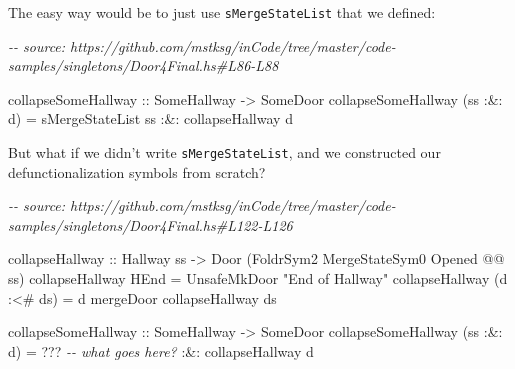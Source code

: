 \documentclass[]{article}
\newenvironment{Shaded}{}{}
\newcommand{\CommentTok}[1]{\textcolor[rgb]{0.38,0.63,0.69}{\textit{#1}}}
\newcommand{\DataTypeTok}[1]{\textcolor[rgb]{0.56,0.13,0.00}{#1}}
\newcommand{\NormalTok}[1]{#1}
\newcommand{\OperatorTok}[1]{\textcolor[rgb]{0.40,0.40,0.40}{#1}}
\newcommand{\OtherTok}[1]{\textcolor[rgb]{0.00,0.44,0.13}{#1}}
\newcommand{\StringTok}[1]{\textcolor[rgb]{0.25,0.44,0.63}{#1}}
\begin{document}
The easy way would be to just use \texttt{sMergeStateList} that we defined:

\begin{Shaded}
\begin{Highlighting}[]
\CommentTok{{-}{-} source: https://github.com/mstksg/inCode/tree/master/code{-}samples/singletons/Door4Final.hs\#L86{-}L88}

\OtherTok{collapseSomeHallway ::} \DataTypeTok{SomeHallway} \OtherTok{{-}\textgreater{}} \DataTypeTok{SomeDoor}
\NormalTok{collapseSomeHallway (ss }\OperatorTok{:\&:}\NormalTok{ d) }\OtherTok{=}\NormalTok{ sMergeStateList ss}
                             \OperatorTok{:\&:}\NormalTok{ collapseHallway d}
\end{Highlighting}
\end{Shaded}

But what if we didn't write \texttt{sMergeStateList}, and we constructed our
defunctionalization symbols from scratch?

\begin{Shaded}
\begin{Highlighting}[]
\CommentTok{{-}{-} source: https://github.com/mstksg/inCode/tree/master/code{-}samples/singletons/Door4Final.hs\#L122{-}L126}

\NormalTok{collapseHallway\textquotesingle{}\textquotesingle{}}
\OtherTok{    ::} \DataTypeTok{Hallway}\NormalTok{ ss}
    \OtherTok{{-}\textgreater{}} \DataTypeTok{Door}\NormalTok{ (}\DataTypeTok{FoldrSym2} \DataTypeTok{MergeStateSym0} \DataTypeTok{\textquotesingle{}Opened} \OperatorTok{@@}\NormalTok{ ss)}
\NormalTok{collapseHallway\textquotesingle{}\textquotesingle{} }\DataTypeTok{HEnd}       \OtherTok{=} \DataTypeTok{UnsafeMkDoor} \StringTok{"End of Hallway"}
\NormalTok{collapseHallway\textquotesingle{}\textquotesingle{} (d }\OperatorTok{:\textless{}\#}\NormalTok{ ds) }\OtherTok{=}\NormalTok{ d }\OtherTok{\textasciigrave{}mergeDoor\textasciigrave{}}\NormalTok{ collapseHallway\textquotesingle{}\textquotesingle{} ds}

\OtherTok{collapseSomeHallway\textquotesingle{}\textquotesingle{} ::} \DataTypeTok{SomeHallway} \OtherTok{{-}\textgreater{}} \DataTypeTok{SomeDoor}
\NormalTok{collapseSomeHallway\textquotesingle{}\textquotesingle{} (ss }\OperatorTok{:\&:}\NormalTok{ d) }\OtherTok{=} \OperatorTok{???}    \CommentTok{{-}{-} what goes here?}
                               \OperatorTok{:\&:}\NormalTok{ collapseHallway\textquotesingle{}\textquotesingle{} d}
\end{Highlighting}
\end{Shaded}
\end{document}
